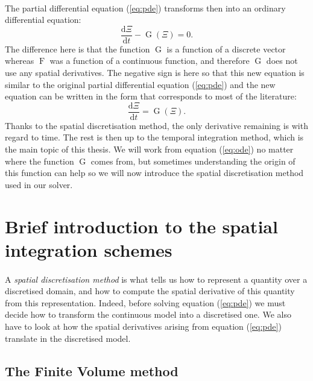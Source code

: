     \paragraph{}
    The partial differential equation (\ref{eq:pde}) transforms then into an ordinary differential equation:
    \begin{equation}
      \frac{\mathrm{d} \Xi}{\mathrm{d} t} - \operatorname{G}\left(\Xi\right) = 0 .
    \end{equation}
    The difference here is that the function $\operatorname{G}$ is a function of a discrete vector whereas $\operatorname{F}$ was a function of a continuous function, and therefore $\operatorname{G}$ does not use any spatial derivatives.
    The negative sign is here so that this new equation is similar to the original partial differential equation (\ref{eq:pde}) and the new equation can be written in the form that corresponds to most of the literature:
    \begin{equation}\label{eq:ode}
      \frac{\mathrm{d} \Xi}{\mathrm{d} t} = \operatorname{G}\left(\Xi\right) .
    \end{equation}
    Thanks to the spatial discretisation method, the only derivative remaining is with regard to time.
    The rest is then up to the temporal integration method, which is the main topic of this thesis.
    We will work from equation (\ref{eq:ode}) no matter where the function $\operatorname{G}$ comes from, but sometimes understanding the origin of this function can help so we will now introduce the spatial discretisation method used in our solver.


  \section{Brief introduction to the spatial integration schemes}

    \paragraph{}
    A \emph{spatial discretisation method} is what tells us how to represent a quantity over a discretised domain, and how to compute the spatial derivative of this quantity from this representation.
    Indeed, before solving equation (\ref{eq:pde}) we must decide how to transform the continuous model into a discretised one.
    We also have to look at how the spatial derivatives arising from equation (\ref{eq:pde}) translate in the discretised model.

    \subsection{The Finite Volume method}


